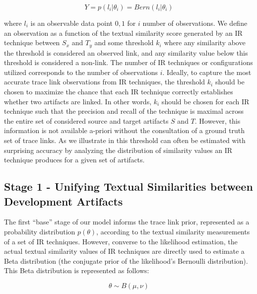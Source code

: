 \begin{equation}\label{eq:likelihood}
Y = p(l_i|\theta_i)= Bern(l_i|\theta_i)
\end{equation}

\noindent {} where $l_i$ is an observable data point ${0,1}$ for $i$ number of observations. We define an observation as a function of the textual similarity score generated by an IR technique between $S_x$ and $T_y$ and some threshold $k_i$ where any similarity above the threshold is considered an observed link, and any similarity value below this threshold is considered a non-link. The number of IR techniques or configurations utilized corresponds to the number of observations $i$.  Ideally, to capture the most accurate trace link observations from IR techniques, the threshold $k_i$ should be chosen to maximize the chance that each IR technique correctly establishes whether two artifacts are linked.  In other words, $k_i$ should be chosen for each IR technique such that the precision and recall of the technique is maximal across the entire set of considered source and target artifacts $S$ and $T$.  However, this information is not available a-priori without the consultation of a ground truth set of trace links. As we illustrate in   this threshold can often be estimated with surprising accuracy by analyzing the distribution of similarity values an IR technique produces for a given set of artifacts. 


\subsection{Stage 1 - Unifying Textual Similarities between Development Artifacts}
\label{sub:model-comp1}

The first ``base'' stage of our model informs the trace link prior, represented as a probability distribution $p(\theta)$, according to the textual similarity measurements of a set of IR techniques.  However, converse to the likelihood estimation, the actual textual similarity values of IR techniques are directly used to estimate a Beta distribution (the conjugate prior of the likelihood's Bernoulli distribution). This Beta distribution is represented as follows: 

\begin{equation}\label{eq:lvl1-dist}
\theta \sim B(\mu, \nu) 
\end{equation}

